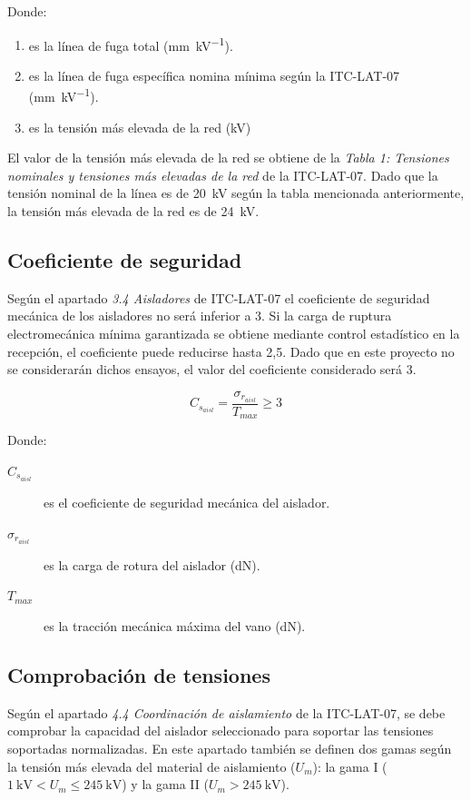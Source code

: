 Donde:
\begin{enumerate}
    \item [$l_t$] es la línea de fuga total (\si{\milli\meter\per\kilo\volt}).
    \item [$l_e$] es la línea de fuga específica nomina mínima según la ITC-LAT-07 (\si{\milli\meter\per\kilo\volt}).
    \item[$U_s$] es la tensión más elevada de la red (\si{\kilo\volt}) 
\end{enumerate}

El valor de la tensión más elevada de la red se obtiene de la \textit{Tabla 1: Tensiones nominales y tensiones más elevadas de la red} de la ITC-LAT-07. Dado que la tensión nominal de la línea es de \SI{20}{\kilo\volt} según la tabla mencionada anteriormente, la tensión más elevada de la red es de \SI{24}{\kilo\volt}. 

\subsection{Coeficiente de seguridad}
\label{subsec:aisl-coefSeguridad}
Según el apartado \textit{3.4 Aisladores} de ITC-LAT-07 el coeficiente de seguridad mecánica de los aisladores no será inferior a 3. Si la carga de ruptura electromecánica mínima garantizada se obtiene mediante control estadístico en la recepción, el coeficiente puede reducirse hasta 2,5. Dado que en este proyecto no se considerarán dichos ensayos, el valor del coeficiente considerado será 3.

\begin{equation}
    C_{s_{aisl}} = \frac{\sigma_{r_{aisl}}}{T_{max}} \geq 3
    \label{eq:coeficiente-seguridad-aislador}
\end{equation}

Donde:
\begin{description}
    \item[$C_{s_{aisl}}$] es el coeficiente de seguridad mecánica del aislador.
    \item[$\sigma_{r_{aisl}}$] es la carga de rotura del aislador (\si{\deca\newton}).
    \item[$T_{max}$] es la tracción mecánica máxima del vano (\si{\deca\newton}).
\end{description}

\subsection{Comprobación de tensiones}
\label{subsec:aisl-comprobacionTension}
Según el apartado \textit{4.4 Coordinación de aislamiento} de la ITC-LAT-07, se debe comprobar la capacidad del aislador seleccionado para soportar las tensiones soportadas normalizadas. En este apartado también se definen dos gamas según la tensión más elevada del material de aislamiento ($U_m$): la gama I ($\SI{1}{\kilo\volt} < U_m \leq \SI{245}{\kilo\volt}$) y la gama II ($U_m > \SI{245}{\kilo\volt}$).

